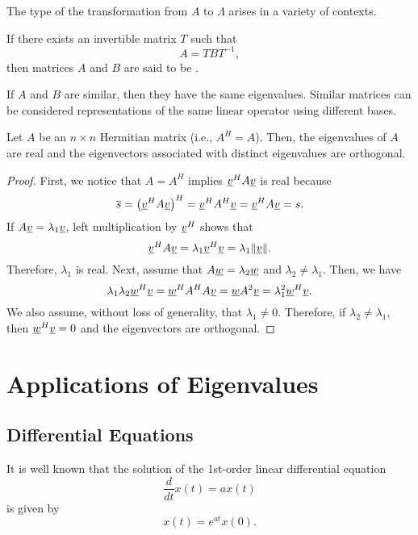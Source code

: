 The type of the transformation from $A$ to $\Lambda$ arises in a variety of contexts.
\begin{definition}
If there exists an invertible matrix $T$ such that
\begin{equation*}
A = T B T^{-1},
\end{equation*}
then matrices $A$ and $B$ are said to be .
\end{definition}

If $A$ and $B$ are similar, then they have the same eigenvalues.
Similar matrices can be considered representations of the same linear operator using different bases.

\begin{lemma}
Let $A$ be an $n\times n$ Hermitian matrix (i.e., $A^H = A$).
Then, the eigenvalues of $A$ are real and the eigenvectors associated with distinct eigenvalues are orthogonal.
\end{lemma}
\begin{proof}
First, we notice that $A = A^H$ implies $\underline{v}^H A \underline{v}$ is real because
\[ \overline{s} = \left( \underline{v}^H A \underline{v} \right)^H = \underline{v}^H A^H \underline{v} = \underline{v}^H A \underline{v} = s. \]
If $A \underline{v} = \lambda_1 \underline{v}$, left multiplication by $\underline{v}^H$ shows that
\[ \underline{v}^H A \underline{v} = \lambda_1 \underline{v}^H \underline{v} = \lambda_1 \| \underline{v} \|. \]
Therefore, $\lambda_1$ is real.
Next, assume that $A \underline{w} = \lambda_2 \underline{w}$ and $\lambda_2 \neq \lambda_1$.
Then, we have
\[ \lambda_1 \lambda_2 \underline{w}^H \underline{v} = \underline{w}^H A^H A \underline{v} = \underline{w} A^2 \underline{v} = \lambda_1^2 \underline{w}^H \underline{v}. \]
We also assume, without loss of generality, that $\lambda_1 \neq 0$.
Therefore, if $\lambda_2 \neq \lambda_1$, then $\underline{w}^H \underline{v} = 0$ and the eigenvectors are orthogonal.
\end{proof}

\section{Applications of Eigenvalues}

\subsection{Differential Equations}
\label{sec:Differential_Equations}

It is well known that the solution of the 1st-order linear differential equation
\[ \frac{d}{dt} x(t) = a x(t) \]
is given by
\[ x(t) = e^{at} x(0). \]

